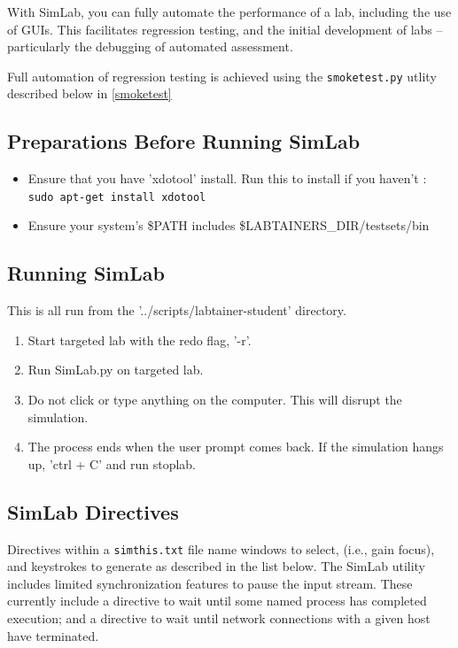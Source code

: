 \documentclass[12pt]{article}
\begin{document}
With SimLab, you can fully automate the performance of a lab, including the use of GUIs.
This facilitates regression testing, and the initial development of labs -- particularly
the debugging of automated assessment.   

Full automation of regression testing is achieved using the {\tt smoketest.py} utlity
described below in \ref{smoketest}

\subsection {Preparations Before Running SimLab}
\begin{itemize}
	\item Ensure that you have 'xdotool' install. Run this to install if you haven't : \\ 
		{\tt sudo apt-get install xdotool}

	\item Ensure your system's \$PATH includes \$LABTAINERS\_DIR/testsets/bin 

\end{itemize}

\subsection {Running SimLab}
This is all run from the '../scripts/labtainer-student' directory.
\begin{enumerate}
	\item Start targeted lab with the redo flag, '-r'.
	\item Run SimLab.py on targeted lab.
	\item Do not click or type anything on the computer. This will disrupt the simulation. 
	\item The process ends when the user prompt comes back. If the simulation hangs up, 'ctrl + C' and run stoplab.
\end{enumerate}


\subsection {SimLab Directives}
Directives within a {\tt simthis.txt} file name windows to select, (i.e., gain focus),
and keystrokes to generate as described in the list below.  The SimLab utility includes
limited synchronization features to pause the input stream.  These currently include a
directive to wait until some named process has completed execution; and a directive to wait
until network connections with a given host have terminated.
\end{document}
